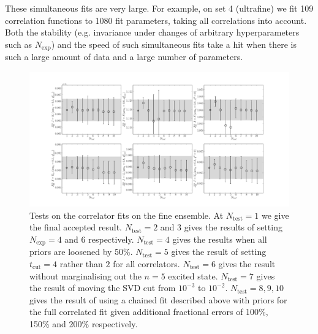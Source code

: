 These simultaneous fits are very large. For example, on set 4 (ultrafine) we fit 109 correlation functions to 1080 fit parameters, taking all correlations into account. Both the stability (e.g. invariance under changes of arbitrary hyperparameters such as $N_{\text{exp}}$) and the speed of such simultaneous fits take a hit when there is such a large amount of data and a large number of parameters.

\begin{figure}
    \hspace{-85pt}
    \includegraphics[width=1.4\textwidth]{images/BsDs/finecorr_fittest.pdf}
    \caption{Tests on the correlator fits on the fine ensemble. At $N_{\text{test}}=1$ we give the final accepted result. $N_{\text{test}}=2$ and $3$ gives the results of setting $N_{\text{exp}}=4$ and $6$ respectively. $N_{\text{test}}=4$ gives the results when all priors are loosened by 50\%. $N_{\text{test}}=5$ gives the result of setting $t_{\text{cut}}=4$ rather than $2$ for all correlators. $N_{\text{test}}=6$ gives the result without marginalising out the $n=5$ excited state. $N_{\text{test}}=7$ gives the result of moving the SVD cut from $10^{-3}$ to $10^{-2}$. $N_{\text{test}}=8,9,10$ gives the result of using a chained fit described above with priors for the full correlated fit given additional fractional errors of 100\%, 150\% and 200\% respectively. \label{fig:corr_tests_BsDs}}
\end{figure}

